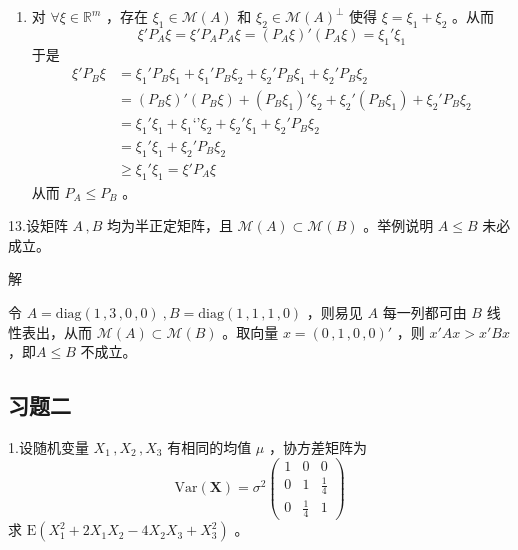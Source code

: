 \documentclass[12pt,hyperref,]{ctexart}
\begin{document}
\begin{enumerate}
\item
  对 \(\forall \xi \in \mathbb{R}^m\) ，存在 \(\xi_1\in \mathcal{M}(A)\)
  和 \(\xi_2\in \mathcal{M}(A)^{\perp}\) 使得 \(\xi=\xi_1+\xi_2\) 。从而
  \begin{equation*}
  \xi' P_A\xi= \xi' P_AP_A\xi=(P_A\xi)'(P_A\xi)=\xi_1'\xi_1
  \end{equation*}于是 \begin{equation*}
  \begin{aligned}
  \xi'P_B\xi & = \xi_1'P_B\xi_1 + \xi_1'P_B\xi_2 +\xi_2'P_B\xi_1 + \xi_2'P_B\xi_2 \\
  & = (P_B\xi)'(P_B\xi) + (P_B\xi_1)'\xi_2 + \xi_2'(P_B\xi_1) + \xi_2'P_B\xi_2 \\
  & = \xi_1'\xi_1 + \xi_1‘’\xi_2 + \xi_2'\xi_1 + \xi_2'P_B\xi_2 \\
  & = \xi_1'\xi_1 + \xi_2'P_B\xi_2 \\
  & \ge \xi_1'\xi_1 =\xi' P_A\xi
  \end{aligned}
  \end{equation*}从而 \(P_A \le P_B\) 。
\end{enumerate}

\vspace{3em}

\kaishu

13.设矩阵 \(A\, ,B\) 均为半正定矩阵，且
\(\mathcal{M}(A)\subset \mathcal{M}(B)\) 。举例说明 \(A\le B\)
未必成立。 \vspace{1em}

\heiti

解

\songti

令
\(A=\mathrm{diag}(1\, ,3\, ,0\, ,0)\ ,B=\mathrm{diag}(1\, ,1\, ,1\, ,0)\)
，则易见 \(A\) 每一列都可由 \(B\) 线性表出，从而
\(\mathcal{M}(A)\subset \mathcal{M}(B)\) 。取向量
\(x=(0\, ,1\, ,0\, ,0)'\) ，则 \(x'Ax>x'Bx\) ，即\(A\le B\) 不成立。

\newpage

\heiti

\hypertarget{section-2}{%
\subsection{习题二}\label{section-2}}

\kaishu

1.设随机变量 \(X_1\, ,X_2\, ,X_3\) 有相同的均值 \(\mu\) ，协方差矩阵为
\begin{equation*}
\mathrm{Var}(\mathbf{X})=\sigma^2
\begin{pmatrix}
1 & 0 & 0 \\
0 & 1 & \frac 14 \\
0 & \frac 14 & 1
\end{pmatrix}
\end{equation*}求 \(\mathrm{E}(X_1^2+2X_1X_2-4X_2X_3+X_3^2)\) 。
\end{document}
